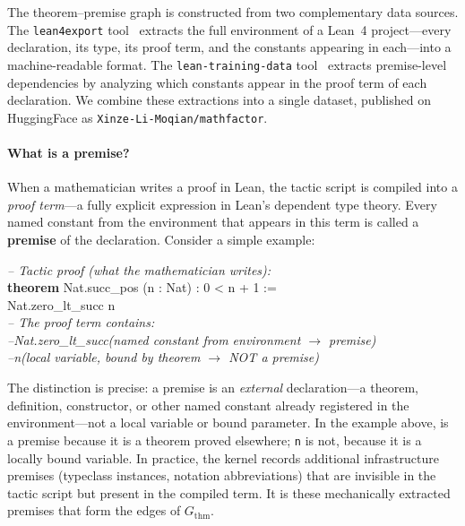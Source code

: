 The theorem--premise graph is constructed from two complementary data sources. The \texttt{lean4export} tool~\cite{lean4export} extracts the full environment of a Lean~4 project---every declaration, its type, its proof term, and the constants appearing in each---into a machine-readable format. The \texttt{lean-training-data} tool~\cite{lean_training_data} extracts premise-level dependencies by analyzing which constants appear in the proof term of each declaration. We combine these extractions into a single dataset, published on HuggingFace as \texttt{Xinze-Li-Moqian/mathfactor}.

\paragraph{What is a premise?}
When a mathematician writes a proof in Lean, the tactic script is compiled into a \emph{proof term}---a fully explicit expression in Lean's dependent type theory. Every named constant from the environment that appears in this term is called a \textbf{premise} of the declaration. Consider a simple example:

\begin{codebox}
\textit{\color{gray}-- Tactic proof (what the mathematician writes):}\\
\textbf{theorem} \textcolor{red!70!black}{Nat.succ\_pos} (n : Nat) : 0 < n + 1 :=\\
\hspace{1.5em}\textcolor{red!70!black}{Nat.zero\_lt\_succ} n\\[3pt]
\textit{\color{gray}-- The proof term contains:}\\
\textit{\color{gray}--\hspace{0.5em}Nat.zero\_lt\_succ\hspace{1em}(named constant from environment $\to$ premise)}\\
\textit{\color{gray}--\hspace{0.5em}n\hspace{6.3em}(local variable, bound by theorem $\to$ NOT a premise)}
\end{codebox}

\noindent
The distinction is precise: a premise is an \emph{external} declaration---a theorem, definition, constructor, or other named constant already registered in the environment---not a local variable or bound parameter. In the example above,  is a premise because it is a theorem proved elsewhere; \texttt{n} is not, because it is a locally bound variable. In practice, the kernel records additional infrastructure premises (typeclass instances, notation abbreviations) that are invisible in the tactic script but present in the compiled term. It is these mechanically extracted premises that form the edges of $G_{\mathrm{thm}}$.

